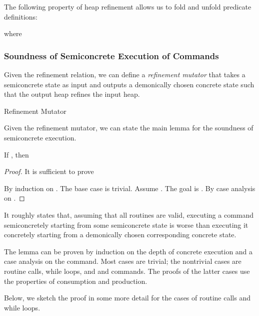 \documentclass{CSML}
\theoremstyle{definition}\newtheorem{notation}[thm]{Notation}
\theoremstyle{plain}\newtheorem{satz}[thm]{Satz}
\begin{document}
The following property of heap refinement allows us to fold and unfold predicate definitions:
\begin{lem}

where 
\end{lem}

\subsubsection{Soundness of Semiconcrete Execution of Commands}

Given the refinement relation, we can define a \emph{refinement mutator} 
 that takes a semiconcrete state as input and outputs a 
demonically chosen concrete state such that the output heap refines the 
input heap. 

\begin{defi}{Refinement Mutator}

\end{defi}

Given the refinement mutator, we can state the main lemma for the 
soundness of semiconcrete execution.
\begin{lem}
If , then

\end{lem}
\begin{proof}
It is sufficient to prove

By induction on . The base case is trivial. Assume . The goal is
. By case analysis on .
\end{proof}
It roughly states that, assuming that 
all routines are valid, executing a command semiconcretely starting from 
some semiconcrete state is worse than executing it concretely starting 
from a demonically chosen corresponding concrete state.

The lemma can be proven by induction on the depth of concrete execution 
and a case analysis on the command. Most cases are trivial; the nontrivial 
cases are routine calls, while loops, and  and 
 commands. The proofs of the latter cases use the 
properties of consumption and production.

Below, we sketch the proof in some more detail for the cases of routine 
calls and while loops.
\end{document}
